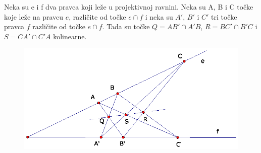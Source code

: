  \label{Sec:3}
%

\begin{tm}
Neka su e i f dva pravca koji le\v{z}e u projektivnoj ravnini. Neka su A, B i C to\v{c}ke koje le\v{z}e
na pravcu $e$, razli\v{c}ite od to\v{c}ke $e \cap f$ i neka su $A'$, $B'$ i $C'$ tri to\v{c}ke pravca $f$
razli\v{c}ite od to\v{c}ke $e \cap f$. Tada su to\v{c}ke $Q=AB' \cap A'B$, $R=BC' \cap B'C$ i
$S=CA' \cap C'A$ kolinearne.
\end{tm}
%
\begin{figure}[!ht]
\begin{center}
\includegraphics[clip, viewport=150 320 440 460]{slike/slika_3-1.eps}
\caption{}
\label{fig:3.1}
\end{center}
\end{figure}

